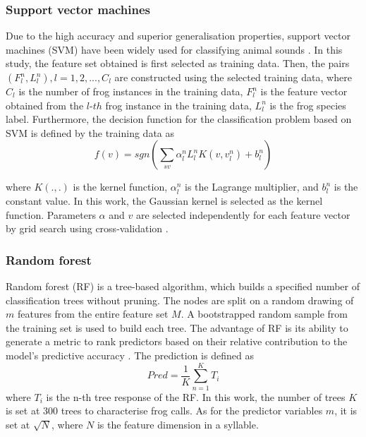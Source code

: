 \subsubsection{Support vector machines}
Due to the high accuracy and superior generalisation properties, support vector machines (SVM) have been widely used for classifying animal sounds \citep{huang2009frog} \citep{acevedo2009automated}. In this study, the feature set obtained is first selected as training data. Then, the pairs $(F_{l}^{n},L_{l}^{n}), l=1,2,..., C_{l}$ are constructed using the selected training data, where $C_{l}$ is the number of frog instances in the training data, $F_{l}^{n}$ is the feature vector obtained from the $l$-$th$ frog instance in the training data, $L_{l}^{n}$ is the frog species label. Furthermore, the decision function for the classification problem based on SVM \citep{cortes1995support} is defined by the training data as 
\begin{equation}
f(v) = sgn(\sum_{sv}\alpha_{l}^{n}L_{l}^{n}K(v,v_{l}^{n})+b_{l}^{n})
\end{equation}

where $K(.,.)$ is the kernel function, $\alpha_{l}^{n}$ is the Lagrange multiplier, and $b_{l}^{n}$ is the constant value. In this work, the Gaussian kernel is selected as the kernel function. Parameters $\alpha$ and $v$ are selected independently for each feature vector by grid search using cross-validation \citep{hsu2003practical}.


\subsubsection{Random forest}
Random forest (RF) is a tree-based algorithm, which builds a specified number of classification trees without pruning. The nodes are split on a random drawing of $m$ features
from the entire feature set $M$. A bootstrapped random sample from the training set is used to build each tree. The advantage of RF is its ability to generate a metric to rank predictors based on their relative contribution to the model's predictive accuracy \citep{bao2005prediction}. The prediction is defined as
\begin{equation}
Pred = \frac{1}{K}\sum_{n=1}^{K}T_{i}
\end{equation}
where $T_{i}$ is the n-th tree response of the RF. In this work, the number of trees $K$ is set at 300 trees to characterise frog calls. As for the predictor variables $m$, it is set at $\sqrt{N}$, where $N$ is the feature dimension in a syllable. 

